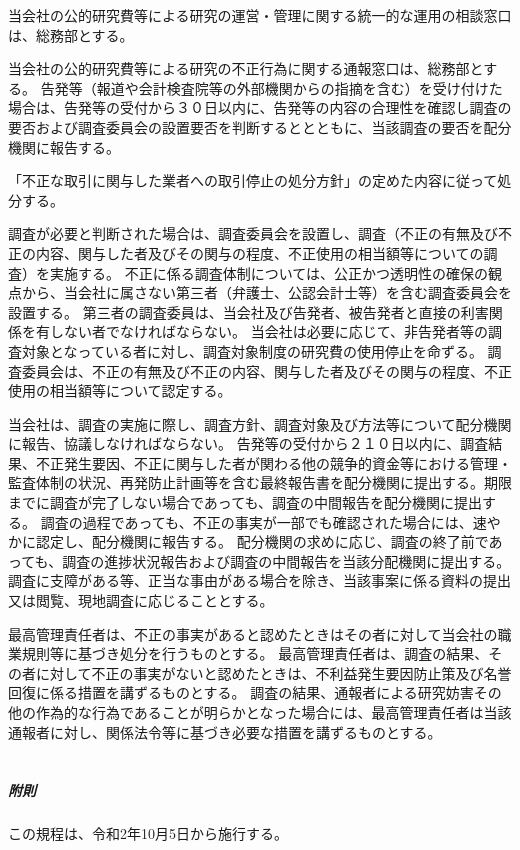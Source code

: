 \documentclass[10pt,a4paper,uplatex]{jsarticle}
\begin{document}
当会社の公的研究費等による研究の運営・管理に関する統一的な運用の相談窓口は、総務部とする。

当会社の公的研究費等による研究の不正行為に関する通報窓口は、総務部とする。
\term 告発等（報道や会計検査院等の外部機関からの指摘を含む）を受け付けた場合は、告発等の受付から３０日以内に、告発等の内容の合理性を確認し調査の要否および調査委員会の設置要否を判断するととともに、当該調査の要否を配分機関に報告する。

「不正な取引に関与した業者への取引停止の処分方針」の定めた内容に従って処分する。

調査が必要と判断された場合は、調査委員会を設置し、調査（不正の有無及び不正の内容、関与した者及びその関与の程度、不正使用の相当額等についての調査）を実施する。
\term 不正に係る調査体制については、公正かつ透明性の確保の観点から、当会社に属さない第三者（弁護士、公認会計士等）を含む調査委員会を設置する。
\term 第三者の調査委員は、当会社及び告発者、被告発者と直接の利害関係を有しない者でなければならない。
\term 当会社は必要に応じて、非告発者等の調査対象となっている者に対し、調査対象制度の研究費の使用停止を命ずる。
\term 調査委員会は、不正の有無及び不正の内容、関与した者及びその関与の程度、不正使用の相当額等について認定する。

当会社は、調査の実施に際し、調査方針、調査対象及び方法等について配分機関に報告、協議しなければならない。
\term 告発等の受付から２１０日以内に、調査結果、不正発生要因、不正に関与した者が関わる他の競争的資金等における管理・監査体制の状況、再発防止計画等を含む最終報告書を配分機関に提出する。期限までに調査が完了しない場合であっても、調査の中間報告を配分機関に提出する。
\term 調査の過程であっても、不正の事実が一部でも確認された場合には、速やかに認定し、配分機関に報告する。
\term 配分機関の求めに応じ、調査の終了前であっても、調査の進捗状況報告および調査の中間報告を当該分配機関に提出する。
\term 調査に支障がある等、正当な事由がある場合を除き、当該事案に係る資料の提出又は閲覧、現地調査に応じることとする。

最高管理責任者は、不正の事実があると認めたときはその者に対して当会社の職業規則等に基づき処分を行うものとする。
\term 最高管理責任者は、調査の結果、その者に対して不正の事実がないと認めたときは、不利益発生要因防止策及び名誉回復に係る措置を講ずるものとする。
\term 調査の結果、通報者による研究妨害その他の作為的な行為であることが明らかとなった場合には、最高管理責任者は当該通報者に対し、関係法令等に基づき必要な措置を講ずるものとする。\\
\\
\subparagraph{附則}
この規程は、令和2年10月5日から施行する。
\end{document}
